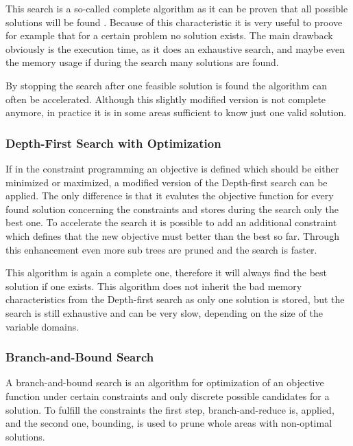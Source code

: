 \documentclass[10pt,
               a4paper,
               journal,
               ]{IEEEtran}
\begin{document}
	This search is a so-called complete algorithm as it can be proven that all possible solutions will be found \cite[p.~85]{handbookCP}. Because of this characteristic it is very useful to proove for example that for a certain problem no solution exists. The main drawback obviously is the execution time, as it does an exhaustive search, and maybe even the memory usage if during the search many solutions are found.
	
	By stopping the search after one feasible solution is found the algorithm can often be accelerated. Although this slightly modified version is not complete anymore, in practice it is in some areas sufficient to know just one valid solution.
	
	\subsubsection{Depth-First Search with Optimization}
	If in the constraint programming an objective is defined which should be either minimized or maximized, a modified version of the Depth-first search can be applied. The only difference is that it evalutes the objective function for every found solution concerning the constraints and stores during the search only the best one. To accelerate the search it is possible to add an additional constraint which defines that the new objective must better than the best so far. Through this enhancement even more sub trees are pruned and the search is faster.
	
	This algorithm is again a complete one, therefore it will always find the best solution if one exists. This algorithm does not inherit the bad memory characteristics from the Depth-first search as only one solution is stored, but the search is still exhaustive and can be very slow, depending on the size of the variable domains.
	
	\subsubsection{Branch-and-Bound Search}
	A branch-and-bound search is an algorithm for optimization of an objective function under certain constraints and only discrete possible candidates for a solution. To fulfill the constraints the first step, branch-and-reduce is, applied, and the second one, bounding, is used to prune whole areas with non-optimal solutions.
	
\end{document}
